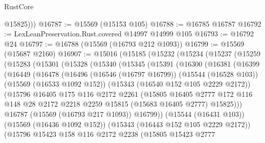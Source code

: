 \begin{lexlean}{RustCore}
\begin{coremodule}
          @15825)))
@16787 := @15569 (@15153 @105)
@16788 := @16785 @16787
@16792 := LexLeanPreservation.Rust.covered @14997 @14999 @105
@16793 := @16792 @24
@16797 := @16788 (@15569 (@16793 @212 @1093))
@16799 := @15569 (@15687 @2160)
@16907 := @15016
    (@15185
      (@15232
        (@15234
          (@15237
            (@15259
              (@15283
                (@15301
                  (@15328
                    (@15340
                      (@15345
                        (@15391
                          (@16300
                            (@16381
                              (@16399
                                (@16449
                                  (@16478
                                    (@16496
                                      (@16546 (@16797 @16799))
                                      (@15544 (@16528 @103))
                                      (@15569 (@16533 @1092 @152))
                                      (@15343 (@16540 @152 @105 @2229 @2172))
                                      (@15796
                                        @16405
                                        @175
                                        @116
                                        @2172
                                        @2261
                                        (@15805
                                          @16405
                                          @2777
                                          @172
                                          @116
                                          @148
                                          @28
                                          @2172
                                          @2218
                                          @2259
                                          @15815
                                          (@15683 @16405 @2777)
                                          @15825)))
                                    @16787
                                    (@15569 (@16793 @217 @1093))
                                    @16799))
                                (@15544 (@16431 @103))
                                (@15569 (@16436 @1092 @152))
                                (@15343 (@16443 @152 @105 @2229 @2172))
                                (@15796
                                  @15423
                                  @158
                                  @116
                                  @2172
                                  @2238
                                  (@15805
                                    @15423
                                    @2777

\end{coremodule}
\end{lexlean}
